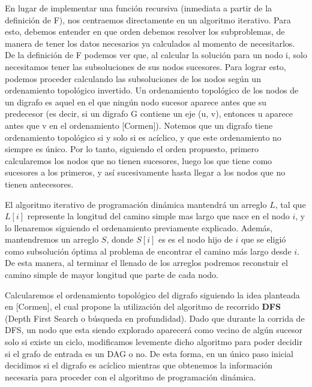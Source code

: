 En lugar de implementar una funci\'on recursiva (inmediata a partir de la definici\'on de F), nos centraemos directamente en un
algoritmo iterativo. 
Para esto, debemos entender en que orden debemos resolver los subproblemas, de manera de tener los datos necesarios ya calculados al momento de necesitarlos. 
De la definici\'on de F podemos ver que, al calcular la soluci\'on para un nodo i, solo necesitamos tener las subsoluciones de sus nodos sucesores. 
Para lograr esto, podemos proceder calculando las subsoluciones de los nodos seg\'un un ordenamiento topol\'ogico invertido.
Un ordenamiento topol\'ogico de los nodos de un digrafo es aquel en el que ning\'un nodo sucesor aparece antes que su predecesor (es decir, si un digrafo G contiene un eje (u, v), entonces u aparece antes que v en el ordenamiento [Cormen]). Notemos que un digrafo tiene ordenamiento topol\'ogico si y solo si es ac\'iclico, y que este ordenamiento no siempre es único. Por lo tanto, siguiendo el orden propuesto, primero calcularemos los nodos que no tienen sucesores, luego los que tiene como sucesores a los primeros, y as\'i sucesivamente hasta llegar a los nodos que no tienen antecesores.

El algoritmo iterativo de programaci\'on din\'amica mantendr\'a un arreglo $L$, tal que $L[i]$ represente la longitud del camino simple mas largo que nace en el nodo $i$, y lo llenaremos siguiendo el ordenamiento previamente explicado. 
Adem\'as, mantendremos un arreglo $S$, donde $S[i]$ es es el nodo hijo de $i$ que se eligi\'o como subsoluci\'on \'optima al problema de encontrar el camino m\'as largo desde $i$. De esta manera, al terminar el llenado de los arreglos podremos reconstuir el camino simple de mayor longitud que parte de cada nodo.

Calcularemos el ordenamiento topol\'ogico del digrafo siguiendo la idea planteada en [Cormen], el cual propone la utilizaci\'on del algoritmo de recorrido \textbf{DFS} (Depth First Search o búsqueda en profundidad). Dado que durante la corrida de DFS, un nodo que esta siendo explorado aparecer\'a como vecino de alg\'un sucesor solo si existe un ciclo, modificamos levemente dicho algoritmo para poder decidir si el grafo de entrada es un DAG o no.
De esta forma, en un \'unico paso inicial decidimos si el digrafo es ac\'iclico mientras que obtenemos la informaci\'on necesaria para proceder con el algoritmo de programaci\'on din\'amica. 


